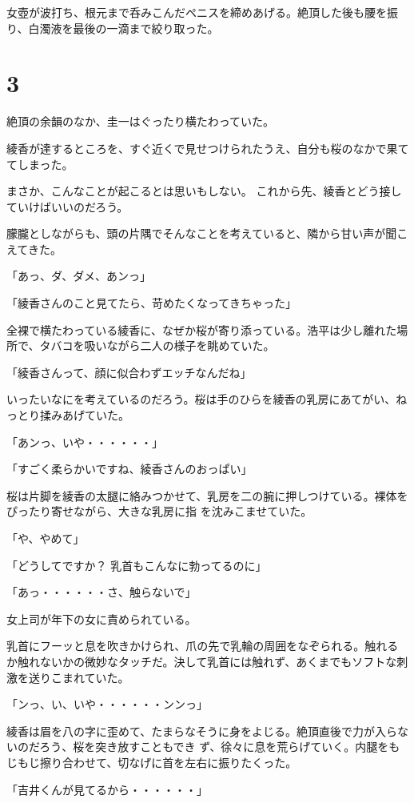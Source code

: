 ﻿\documentclass[book,tate]{jlreq}
\begin{document}
女壺が波打ち、根元まで呑みこんだペニスを締めあげる。絶頂した後も腰を振り、白濁液を最後の一滴まで絞り取った。

\section*{3}

絶頂の余韻のなか、圭一はぐったり横たわっていた。

綾香が達するところを、すぐ近くで見せつけられたうえ、自分も桜のなかで果ててしまった。

まさか、こんなことが起こるとは思いもしない。 これから先、綾香とどう接していけばいいのだろう。

朦朧としながらも、頭の片隅でそんなことを考えていると、隣から甘い声が聞こえてきた。

「あっ、ダ、ダメ、あンっ」

「綾香さんのこと見てたら、苛めたくなってきちゃった」

全裸で横たわっている綾香に、なぜか桜が寄り添っている。浩平は少し離れた場所で、タバコを吸いながら二人の様子を眺めていた。

「綾香さんって、顔に似合わずエッチなんだね」

いったいなにを考えているのだろう。桜は手のひらを綾香の乳房にあてがい、ねっとり揉みあげていた。

「あンっ、いや・・・・・・」

「すごく柔らかいですね、綾香さんのおっぱい」

桜は片脚を綾香の太腿に絡みつかせて、乳房を二の腕に押しつけている。裸体をぴったり寄せながら、大きな乳房に指 を沈みこませていた。

「や、やめて」

「どうしてですか？ 乳首もこんなに勃ってるのに」

「あっ・・・・・・さ、触らないで」

女上司が年下の女に責められている。

乳首にフーッと息を吹きかけられ、爪の先で乳輪の周囲をなぞられる。触れるか触れないかの微妙なタッチだ。決して乳首には触れず、あくまでもソフトな刺激を送りこまれていた。

「ンっ、い、いや・・・・・・ンンっ」

綾香は眉を八の字に歪めて、たまらなそうに身をよじる。絶頂直後で力が入らないのだろう、桜を突き放すこともでき ず、徐々に息を荒らげていく。内腿をもじもじ擦り合わせて、切なげに首を左右に振りたくった。

「吉井くんが見てるから・・・・・・」
\end{document}
